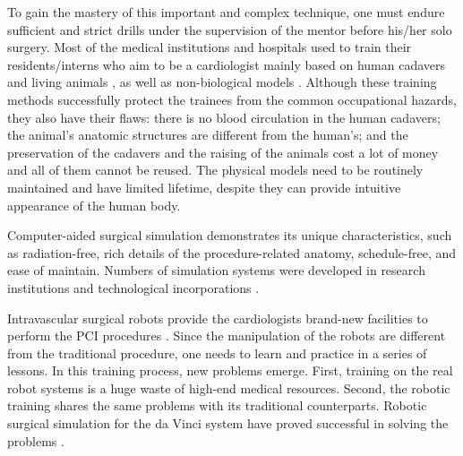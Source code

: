 To gain the mastery of this important and complex technique, one must endure sufficient and strict drills under the supervision of the mentor before his/her solo surgery.
Most of the medical institutions and hospitals used to train their residents/interns who aim to be a cardiologist mainly based on human cadavers and living animals \cite{Lunderquist1995}, as well as non-biological models \cite{Mori1998}.
Although these training methods successfully protect the trainees from the common occupational hazards, they also have their flaws:
there is no blood circulation in the human cadavers;
the animal's anatomic structures are different from the human's;
and the preservation of the cadavers and the raising of the animals cost a lot of money and all of them cannot be reused.
The physical models need to be routinely maintained and have limited lifetime, despite they can provide intuitive appearance of the human body.

Computer-aided surgical simulation demonstrates its unique characteristics, such as radiation-free, rich details of the procedure-related anatomy, schedule-free, and ease of maintain.
Numbers of simulation systems were developed in research institutions \cite{Dawson1996DK,Wang1997ICard,Cotin2000ICTS} and technological incorporations \cite{CAEWeb,MenticeWeb,SimbionixWeb}.

Intravascular surgical robots provide the cardiologists brand-new facilities to perform the PCI procedures \cite{NIOBEWeb,HansenWeb,Beyar2006RNS,Smilowitz2012}.
Since the manipulation of the robots are different from the traditional procedure, one needs to learn and practice in a series of lessons.
In this training process, new problems emerge.
First, training on the real robot systems is a huge waste of high-end medical resources.
Second, the robotic training shares the same problems with its traditional counterparts.
Robotic surgical simulation for the da Vinci system have proved successful in solving the problems \cite{Liss2012,Kesavadas2011}.

